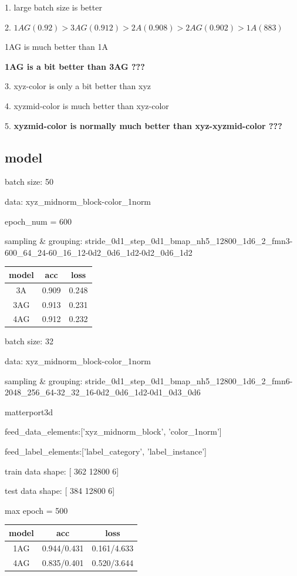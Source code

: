 \documentclass{article}
\begin{document}
1. large batch size is better \par
2. $1AG (0.92) > 3AG(0.912) > 2A(0.908) > 2AG(0.902) > 1A(883)$ \par
   1AG is much better than 1A \par 
   \textbf{1AG is a bit better than 3AG ???} \par

3. xyz-color is only a bit better than xyz \par
4. xyzmid-color is much better than xyz-color \par
5. \textbf{xyzmid-color is normally much better than xyz-xyzmid-color ???} \par



\subsection{model}
batch size: 50 \par
data: xyz\_midnorm\_block-color\_1norm \par
epoch\_num = 600 \par
sampling \& grouping: stride\_0d1\_step\_0d1\_bmap\_nh5\_12800\_1d6\_2\_fmn3-600\_64\_24-60\_16\_12-0d2\_0d6\_1d2-0d2\_0d6\_1d2 \par
\begin{center}
	\begin{tabular}{|c | c c |} 
		\hline
		model  & acc & loss \\
		\hline
		3A & 0.909 & 0.248 \\ [0.5ex] 
		\hline
		3AG & 0.913 & 0.231 \\ [0.5ex] 
		\hline
		4AG & 0.912 & 0.232 \\ [0.5ex] 
		\hline	
	\end{tabular}
\end{center}

batch size: 32 \par
data: xyz\_midnorm\_block-color\_1norm \par
sampling \& grouping: stride\_0d1\_step\_0d1\_bmap\_nh5\_12800\_1d6\_2\_fmn6-2048\_256\_64-32\_32\_16-0d2\_0d6\_1d2-0d1\_0d3\_0d6 \par
matterport3d  \par
feed\_data\_elements:['xyz\_midnorm\_block', 'color\_1norm']  \par
feed\_label\_elements:['label\_category', 'label\_instance']  \par
train data shape: [  362 12800     6]  \par  
test data shape: [  384 12800     6] \par
max epoch = 500
\begin{center}
	\begin{tabular}{|c | c c |} 
		\hline
		model  & acc & loss \\
		\hline
		1AG & 0.944/0.431 & 0.161/4.633 \\ [0.5ex] 
		\hline
		
		4AG & 0.835/0.401 & 0.520/3.644 \\ [0.5ex] 
		\hline	
	\end{tabular}
\end{center}
\end{document}
